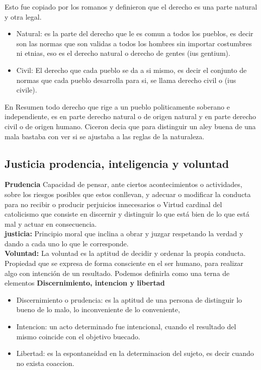 \documentclass[12pt]{book}
\begin{document}
Esto fue copiado por los romanos y definieron que el derecho es una parte natural y otra legal.
\begin{itemize}
\item Natural: es la parte del derecho que le es comun a todos los pueblos, es decir son las normas que son validas a todos los hombres sin importar costumbres ni etnias, eso es el derecho natural o derecho de gentes (ius gentium).
\item Civil: El derecho que cada pueblo se da a si mismo, es decir el conjunto de normas que cada pueblo desarrolla para si, se llama derecho civil o (ius civile).
\end{itemize}

En Resumen todo derecho que rige a un pueblo politicamente soberano e independiente, es en parte derecho natural o de origen natural y en parte derecho civil o de origen humano.
Ciceron decia que para distinguir un aley buena de una mala bastaba con ver si se ajustaba a las reglas de la naturaleza.


\subsection{Justicia prodencia, inteligencia y voluntad}
\textbf{Prudencia} Capacidad de pensar, ante ciertos acontecimientos o actividades, sobre los riesgos posibles que estos conllevan, y adecuar o modificar la conducta para no recibir o producir perjuicios innecesarios o Virtud cardinal del catolicismo que consiste en discernir y distinguir lo que está bien de lo que está mal y actuar en consecuencia.
\\
\textbf{justicia:} Principio moral que inclina a obrar y juzgar respetando la verdad y dando a cada uno lo que le corresponde.
\\
\textbf{Voluntad:} La voluntad es la aptitud de decidir y ordenar la propia conducta. Propiedad que se expresa de forma consciente en el ser humano, para realizar algo con intención de un resultado.
Podemos definirla como una terna de elementos \textbf{Discernimiento, intencion y libertad}
\begin{itemize}
\item Discernimiento o prudencia: es la aptitud de una persona de distinguir lo bueno de lo malo, lo inconveniente de lo conveniente,
\item Intencion: un acto determinado fue intencional, cuando el resultado del mismo coincide con el objetivo buecado.
\item Libertad: es la espontaneidad en la determinacion del sujeto, es decir cuando no exista coaccion.
\end{itemize}
\end{document}
